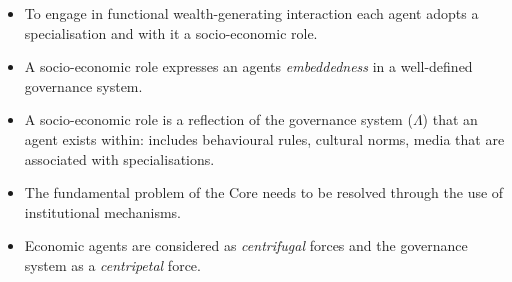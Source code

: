 \documentclass[9pt]{beamer}
\begin{document}
\begin{frame} %
\begin{itemize}
\item To engage in functional wealth-generating interaction each agent adopts a specialisation and with it a socio-economic role.
\medskip
\item A socio-economic role expresses an agents \emph{embeddedness} in a well-defined governance system.
\medskip
\begin{figure}[h]
\begin{center}
\end{center}
\end{figure}
\medskip
\item A socio-economic role is a reflection of the governance system ($\Lambda$) that an agent exists within: includes behavioural rules, cultural norms, media that are associated with specialisations.
\end{itemize}
\end{frame}


\begin{frame} %
\begin{itemize}
\item The fundamental problem of the Core needs to be resolved through the use of institutional mechanisms.
\end{itemize}
\medskip
\begin{figure}[h]
\begin{center}
\end{center}
\end{figure}
\begin{itemize}
\medskip
\item Economic agents are considered as \emph{centrifugal} forces and the governance system as a \emph{centripetal} force.
\end{itemize}
\end{frame}
\end{document}
